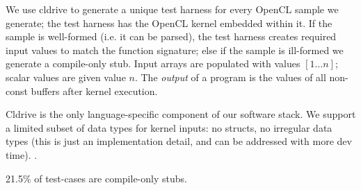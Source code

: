 We use cldrive to generate a unique test harness for every OpenCL sample we generate; the test harness has the OpenCL kernel embedded within it. If the sample is well-formed (i.e. it can be parsed), the test harness creates required input values to match the function signature; else if the sample is ill-formed we generate a compile-only stub. Input arrays are populated with values {$[1 \ldots n]$}; scalar values are given value $n$. The \emph{output} of a program is the values of all non-const buffers after kernel execution.

Cldrive is the only language-specific component of our software stack. We support a limited subset of data types for kernel inputs: no structs, no irregular data types (this is just an implementation detail, and can be addressed with more dev time). .

21.5\% of test-cases are compile-only stubs.
